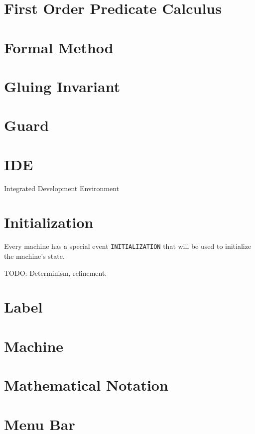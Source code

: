\section{First Order Predicate Calculus}
\label{first_order_predicate_calculus}


\section{Formal Method}
\label{formal_method}

\section{Gluing Invariant}
\label{gluing_invariant}

\section{Guard}
\label{guard}

\section{IDE}
\label{ide}

Integrated Development Environment

\section{Initialization}
\label{initialization}

Every machine has a special event \texttt{INITIALIZATION} that will be used to initialize the machine's state.

TODO: Determinism, refinement.

\section{Label}
\label{label}

\section{Machine}
\label{machine}

\section{Mathematical Notation}
\label{mathematical_notation}

\section{Menu Bar}
\label{menu_bar}

